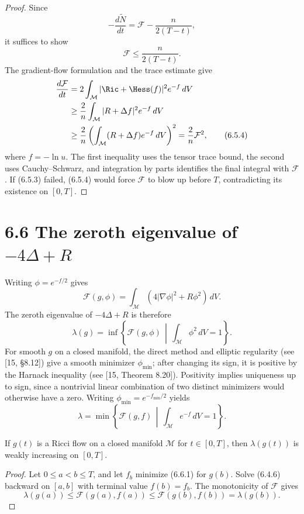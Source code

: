 \begin{proof}
\sketch Since
\[
-\frac{d\widetilde N}{dt}=\mathcal F-\frac{n}{2(T-t)},
\]
it suffices to show
\begin{equation}
\mathcal F\leq\frac{n}{2(T-t)}. \tag{6.5.3}
\end{equation}
The gradient-flow formulation and the trace estimate give
\begin{align}
\frac{d\mathcal F}{dt}
&=2\int_{\mathcal M}|\Ric+\Hess(f)|^2e^{-f}\,dV \\
&\geq\frac2n\int_{\mathcal M}|R+\Delta f|^2e^{-f}\,dV \\
&\geq\frac2n\left(\int_{\mathcal M}(R+\Delta f)e^{-f}\,dV\right)^2
=\frac2n\mathcal F^2, \tag{6.5.4}
\end{align}
where $f=-\ln u$. The first inequality uses the tensor trace bound, the
second uses Cauchy--Schwarz, and integration by parts identifies the final
integral with $\mathcal F$. If (6.5.3) failed, (6.5.4) would force $\mathcal F$
to blow up before $T$, contradicting its existence on $[0,T]$.
\end{proof}

\section{6.6 \quad The zeroth eigenvalue of \texorpdfstring{$-4\Delta + R$}{-4 Delta + R}}

Writing $\phi=e^{-f/2}$ gives
\[
\mathcal F(g,\phi)=\int_{\mathcal M}(4|\nabla\phi|^2+R\phi^2)\,dV.
\]
The zeroth eigenvalue of $-4\Delta+R$ is therefore
\[
\lambda(g)=\inf\left\{\mathcal F(g,\phi)\,\middle|\,
\int_{\mathcal M}\phi^2\,dV=1\right\}.
\]
For smooth $g$ on a closed manifold, the direct method and elliptic regularity
(see [15, \S8.12]) give a smooth minimizer $\phi_{\min}$; after changing its
sign, it is positive by the Harnack inequality (see [15, Theorem 8.20]).
Positivity implies uniqueness up to sign, since a nontrivial linear
combination of two distinct minimizers would otherwise have a zero. Writing
$\phi_{\min}=e^{-f_{\min}/2}$ yields
\begin{equation}
\lambda=\min\left\{\mathcal F(g,f)\,\middle|\,
\int_{\mathcal M}e^{-f}\,dV=1\right\}. \tag{6.6.1}
\end{equation}

\begin{theorem}
\label{topping-gradient-flow-z0-eigenvalue-monotone}
If $g(t)$ is a Ricci flow on a closed manifold $\mathcal M$ for
$t\in[0,T]$, then $\lambda(g(t))$ is weakly increasing on $[0,T]$.
\end{theorem}

\begin{proof}
\sketch Let $0\leq a<b\leq T$, and let $f_b$ minimize (6.6.1) for $g(b)$.
Solve (6.4.6) backward on $[a,b]$ with terminal value $f(b)=f_b$. The
monotonicity of $\mathcal F$ gives
\[
\lambda(g(a))\leq\mathcal F(g(a),f(a))
\leq\mathcal F(g(b),f(b))=\lambda(g(b)).
\]
\end{proof}
